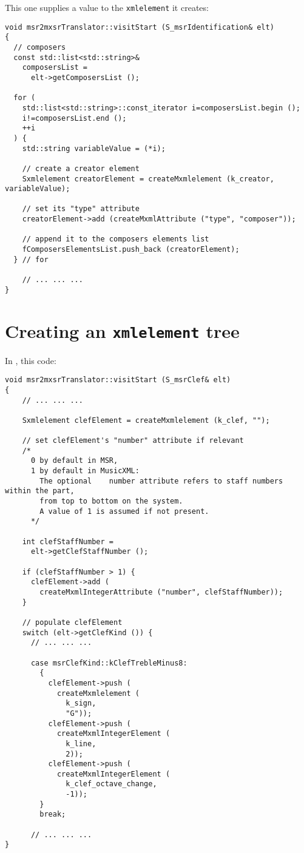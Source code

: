 This one supplies a value to the {\tt xmlelement} it creates:
\begin{lstlisting}[language=CPlusPlus]
void msr2mxsrTranslator::visitStart (S_msrIdentification& elt)
{
  // composers
  const std::list<std::string>&
    composersList =
      elt->getComposersList ();

  for (
    std::list<std::string>::const_iterator i=composersList.begin ();
    i!=composersList.end ();
    ++i
  ) {
    std::string variableValue = (*i);

    // create a creator element
    Sxmlelement creatorElement = createMxmlelement (k_creator, variableValue);

    // set its "type" attribute
    creatorElement->add (createMxmlAttribute ("type", "composer"));

    // append it to the composers elements list
    fComposersElementsList.push_back (creatorElement);
  } // for

	// ... ... ...
}
\end{lstlisting}


\section{Creating an {\tt xmlelement} tree}

In {\tt }, this code:
\begin{lstlisting}[language=CPlusPlus]
void msr2mxsrTranslator::visitStart (S_msrClef& elt)
{
    // ... ... ...

    Sxmlelement clefElement = createMxmlelement (k_clef, "");

    // set clefElement's "number" attribute if relevant
    /*
      0 by default in MSR,
      1 by default in MusicXML:
        The optional	number attribute refers to staff numbers within the part,
        from top to bottom on the system.
        A value of 1 is assumed if not present.
	  */

    int clefStaffNumber =
      elt->getClefStaffNumber ();

    if (clefStaffNumber > 1) {
      clefElement->add (
        createMxmlIntegerAttribute ("number", clefStaffNumber));
    }

    // populate clefElement
    switch (elt->getClefKind ()) {
      // ... ... ...

      case msrClefKind::kClefTrebleMinus8:
        {
          clefElement->push (
            createMxmlelement (
              k_sign,
              "G"));
          clefElement->push (
            createMxmlIntegerElement (
              k_line,
              2));
          clefElement->push (
            createMxmlIntegerElement (
              k_clef_octave_change,
              -1));
        }
        break;

      // ... ... ...
}
\end{lstlisting}

